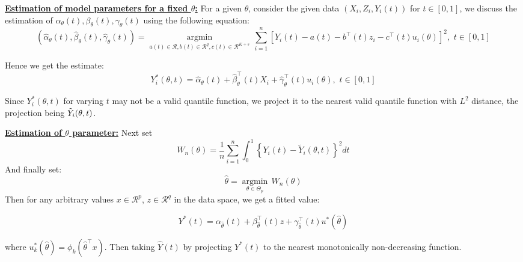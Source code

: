 \documentclass{article}
\begin{document}
\vspace{1em}
\underline{\textbf{Estimation of model parameters for a fixed $\theta$:}} For a given $\theta$, consider the given data $(X_i,Z_i,Y_i(t))$ for $t\in [0,1]$, we discuss the estimation of $\alpha_{\theta}(t),\beta_{\theta}(t),\gamma_{\theta}(t)$ using the following equation: $$\left(\hat{\alpha}_{\theta}(t),\hat{\beta}_{\theta}(t), \hat{\gamma}_{\theta}(t)\right)=\underset{a(t)\in \mathcal{R},b(t)\in \mathcal{R}^q,c(t)\in 
\mathcal{R}^{K+s}}{\operatorname{argmin}}\, \sum_{i=1}^{n}\left[Y_{i}(t)-a(t)-b^{\top}(t) z_{i}-c^{\top}(t) u_{i}(\theta)\right]^{2},\,\,t\in [0,1]$$

Hence we get the estimate: \begin{equation}
Y_{i}^{*}(\theta, t)=\hat{\alpha}_{\theta}(t)+\hat{\beta}_{\theta}^{\top}(t) X_{i}+\hat{\gamma}_{\theta}^{\top}(t) u_{i}(\theta),\,\, t\in [0,1]
\label{eq:Yhat_theta_t}
\end{equation}

Since $Y_i^{*}(\theta,t)$ for varying $t$ may not be a valid quantile function, we project it to the nearest valid quantile function with $L^2$ distance, the projection being $\Tilde{Y}_i(\theta,t)$.

\vspace{1em} \underline{\textbf{Estimation of $\theta$ parameter:}} Next set \begin{equation}
W_{n}(\theta)=\frac{1}{n} \sum_{i=1}^{n} \int_{0}^{1}\left\{Y_{i}(t)-\tilde{Y}_{i}(\theta, t)\right\}^{2} d t
\label{eq:W_n_function}
\end{equation}
And finally set:
\begin{equation}
\hat{\theta}=\underset{\theta\in \Theta_p}{\operatorname{argmin}}\, W_{n}(\theta)
\label{eq:theta_estimate}
\end{equation}
Then for any arbitrary values $x\in \mathcal{R}^p$, $z\in \mathcal{R}^q$ in the data space, we get a fitted value: 

\begin{equation}
Y^{*}(t)=\alpha_{\hat{\theta}}(t)+\beta_{\hat{\theta}}^{\top}(t) z+\gamma_{\hat{\theta}}^{\top}(t) u^{*}(\hat{\theta})
\label{eq:Yhat_finally}
\end{equation}

where $u_{k}^{*}(\hat{\theta})=\phi_{k}\left(\hat{\theta}^{\top} x\right)$. Then taking $\hat{Y}(t)$ by projecting $Y^{*}(t)$ to the nearest monotonically non-decreasing function.
\end{document}
